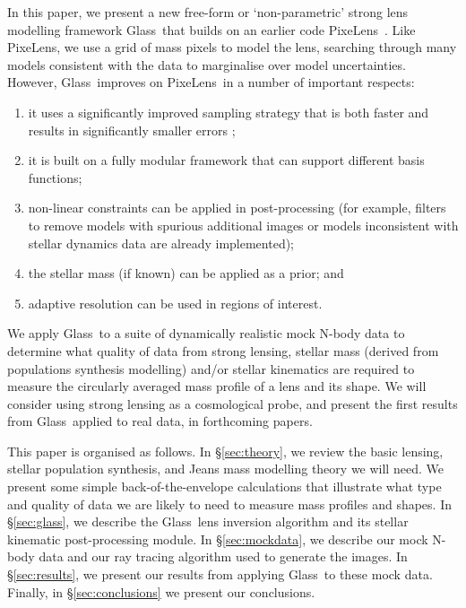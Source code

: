 \documentclass[galley]{mn2e}
\newcommand{\Glass}{{\sc Glass}}
\newcommand{\PixeLens}{{\sc PixeLens}}
\begin{document}

In this paper, we present a new free-form or `non-parametric' strong lens modelling framework \Glass\ that builds on an earlier code \PixeLens\ \citep{1997MNRAS.292..148S,2008ApJ...679...17C}. Like \PixeLens, we use a grid of mass pixels to model the lens, searching through many models consistent with the data to marginalise over model uncertainties. However, \Glass\ improves on \PixeLens\ in a number of important respects:

\begin{enumerate} 
\item it uses a significantly improved sampling strategy that is both faster and results in significantly smaller errors \citep{2012MNRAS.425.3077L};
\item it is built on a fully modular framework that can support different basis functions;
\item non-linear constraints can be applied in post-processing (for example, filters to remove models with spurious additional images or models inconsistent with stellar dynamics data are already implemented);
\item the stellar mass (if known) can be applied as a prior; and
\item adaptive resolution can be used in regions of interest. 
\end{enumerate}

We apply \Glass\ to a suite of dynamically realistic mock N-body data to determine what quality of data from strong lensing, stellar mass (derived from populations synthesis modelling) and/or stellar kinematics are required to measure the circularly averaged mass profile of a lens and its shape. We will consider using strong lensing as a cosmological probe, and present the first results from \Glass\ applied to real data, in forthcoming papers.

This paper is organised as follows. In \S\ref{sec:theory}, we review the basic lensing, stellar population synthesis, and Jeans mass modelling theory we will need. We present some simple back-of-the-envelope calculations that illustrate what type and quality of data we are likely to need to measure mass profiles and shapes. In \S\ref{sec:glass}, we describe the \Glass\ lens inversion algorithm and its stellar kinematic post-processing module. In \S\ref{sec:mockdata}, we describe our mock N-body data and our ray tracing algorithm used to generate the images. In \S\ref{sec:results}, we present our results from applying \Glass\ to these mock data. Finally, in \S\ref{sec:conclusions} we present our conclusions. 
\end{document}
